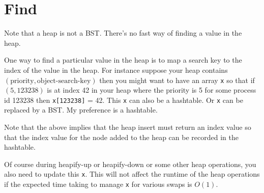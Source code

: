 \section{Find}

Note that a heap is not a BST.
There's no fast way of finding a value in the heap.

One way to find a particular value in the heap 
is 
to map a search key to the index of the value in 
the heap.
For instance suppose your heap contains 
$(\text{priority}, \text{object-search-key})$
then you might want to have an array
\verb!x! so that 
if 
$(\text{5}, \text{123238})$
is at index 42 in your heap
where the priority is 5 for some process id 123238
then 
\verb!x[123238]! = 42.
This \verb!x! can also be a hashtable.
Or \verb!x! can be replaced by a BST.
My preference is a hashtable.

Note that the above implies that 
the heap insert must return an index value
so that the index value for the node added to the 
heap can be recorded in the hashtable.

Of course during heapify-up or heapify-down or some other
heap operations, you also need to update
this \verb!x!.
This will not affect the runtime of the heap operations
if the expected time taking to manage
\verb!x! for various swaps is $O(1)$.


